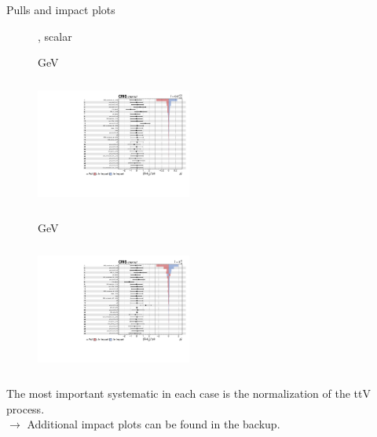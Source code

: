 \documentclass[8pt]{beamer}
\begin{document}
\begin{frame}{Pulls and impact plots}
\justifying
\begin{figure}[htbp]
\centering
\begin{block}{, scalar}\end{block}	\vspace{-8pt}

\begin{minipage}[b]{0.49\textwidth}
\begin{center}
\centering \begin{block}{ GeV}\end{block}	
\includegraphics[width=5.1cm, height=4.2cm]{figs/impacts_2016_both_scalar_100.pdf}
\end{center}
\end{minipage}\hfill
\begin{minipage}[b]{0.49\textwidth}
\begin{center}
\centering \begin{block}{ GeV}\end{block}	
\includegraphics[width=5.1cm, height=4.2cm]{figs/impacts_2016_both_scalar_500.pdf}
\end{center}
\end{minipage} \hfill
\end{figure}

The most important systematic in each case is the normalization of the ttV process. \\
$\rightarrow$ Additional impact plots can be found in the backup. \vfill
\end{frame}
\end{document}
